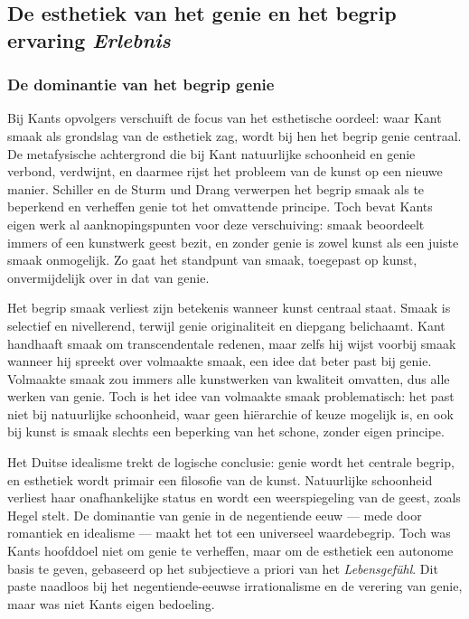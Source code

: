 \documentclass[11pt,twoside,openright]{memoir}
\begin{document}
\subsection{De esthetiek van het genie en het begrip ervaring \textit{Erlebnis}}

\subsubsection{De dominantie van het begrip genie}

Bij Kants opvolgers verschuift de focus van het esthetische oordeel: waar Kant smaak als grondslag van de esthetiek zag, wordt bij hen het begrip genie centraal. De metafysische achtergrond die bij Kant natuurlijke schoonheid en genie verbond, verdwijnt, en daarmee rijst het probleem van de kunst op een nieuwe manier. Schiller en de Sturm und Drang verwerpen het begrip smaak als te beperkend en verheffen genie tot het omvattende principe. Toch bevat Kants eigen werk al aanknopingspunten voor deze verschuiving: smaak beoordeelt immers of een kunstwerk geest bezit, en zonder genie is zowel kunst als een juiste smaak onmogelijk. Zo gaat het standpunt van smaak, toegepast op kunst, onvermijdelijk over in dat van genie.

Het begrip smaak verliest zijn betekenis wanneer kunst centraal staat. Smaak is selectief en nivellerend, terwijl genie originaliteit en diepgang belichaamt. Kant handhaaft smaak om transcendentale redenen, maar zelfs hij wijst voorbij smaak wanneer hij spreekt over volmaakte smaak, een idee dat beter past bij genie. Volmaakte smaak zou immers alle kunstwerken van kwaliteit omvatten, dus alle werken van genie. Toch is het idee van volmaakte smaak problematisch: het past niet bij natuurlijke schoonheid, waar geen hiërarchie of keuze mogelijk is, en ook bij kunst is smaak slechts een beperking van het schone, zonder eigen principe.

Het Duitse idealisme trekt de logische conclusie: genie wordt het centrale begrip, en esthetiek wordt primair een filosofie van de kunst. Natuurlijke schoonheid verliest haar onafhankelijke status en wordt een weerspiegeling van de geest, zoals Hegel stelt. De dominantie van genie in de negentiende eeuw — mede door romantiek en idealisme — maakt het tot een universeel waardebegrip. Toch was Kants hoofddoel niet om genie te verheffen, maar om de esthetiek een autonome basis te geven, gebaseerd op het subjectieve a priori van het \textit{Lebensgefühl}. Dit paste naadloos bij het negentiende-eeuwse irrationalisme en de verering van genie, maar was niet Kants eigen bedoeling.
\end{document}

